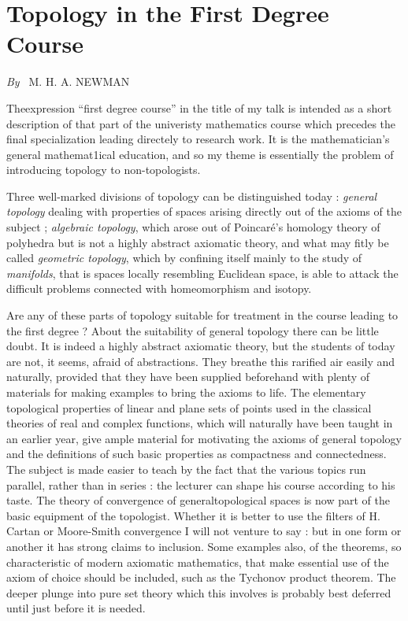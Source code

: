 
\chapter{Topology in the First Degree Course}

\begin{center}
{\em By~} M. H. A. NEWMAN
\end{center}

\setcounter{pageoriginal}{94}
The\pageoriginale expression ``first degree course'' in the title of my talk is
intended as a short description of that part of the univeristy
mathematics course which precedes the final specialization leading
directely to research work. It is the mathematician's general
mathemat1ical education, and so my theme is essentially the problem of
introducing topology to non-topologists.

Three well-marked divisions of topology can be distinguished today :
\textit{general topology} dealing with properties of spaces arising
directly out of the axioms of the subject ; \textit{algebraic
  topology}, which arose out of Poincar\'e's homology theory of
  polyhedra but is not a highly abstract axiomatic theory, and what
  may fitly be called \textit{geometric topology}, which by confining
  itself mainly to the study of \textit{manifolds}, that is spaces
  locally resembling Euclidean space, is able to attack the difficult
  problems connected with homeomorphism and isotopy.

Are any of these parts of topology suitable for treatment in the
course leading to the first degree ? About the suitability of general
topology there can be little doubt. It is indeed a highly abstract
axiomatic theory, but the students of today are not, it seems, afraid
of abstractions. They breathe this rarified air easily and naturally,
provided that they have been supplied beforehand with plenty of
materials for making examples to bring the axioms to life. The
elementary topological properties of linear and plane sets of points
used in the classical theories of real and complex functions, which
will naturally have been taught in an earlier year, give ample
material for motivating the axioms of general topology and the
definitions of such basic properties as compactness and
connectedness. The subject is made easier to teach by the fact that
the various topics run parallel, rather than in series : the lecturer
can shape his course according to his taste. The theory of convergence
of general\pageoriginale topological spaces is now part of the basic
equipment of the topologist. Whether it is better to use the filters
of H. Cartan or Moore-Smith convergence I will not venture to say :
but in one form or another it has strong claims to inclusion. Some
examples also, of the theorems, so characteristic of modern axiomatic
mathematics, that make essential use of the axiom of choice should be
included, such as the Tychonov product theorem. The deeper plunge into
pure set theory which this involves is probably best deferred until
just before it is needed. 

